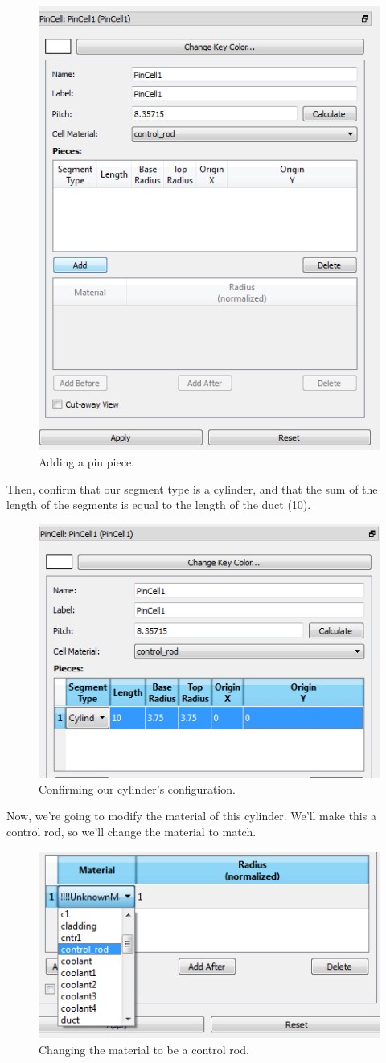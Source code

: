 \begin{figure}[H]
	\begin{center}
		\includegraphics[width=0.5\linewidth]{Images/hex-11.png}
		\caption{Adding a pin piece.}
		\label{fig:Hex11}
	\end{center}
\end{figure}

Then, confirm that our segment type is a cylinder, and that the sum of the length of the segments is equal to the length of the duct (10).

\begin{figure}[H]
	\begin{center}
		\includegraphics[width=0.5\linewidth]{Images/hex-12.png}
		\caption{Confirming our cylinder's configuration.}
		\label{fig:Hex12}
	\end{center}
\end{figure}

Now, we're going to modify the material of this cylinder.  We'll make this a control rod, so we'll change the material to match.

\begin{figure}[H]
	\begin{center}
		\includegraphics[width=0.5\linewidth]{Images/hex-13.png}
		\caption{Changing the material to be a control rod.}
		\label{fig:Hex13}
	\end{center}
\end{figure}

